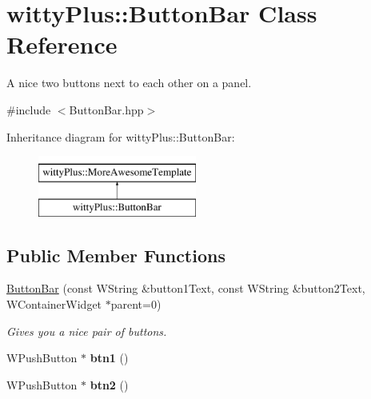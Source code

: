 \hypertarget{classwittyPlus_1_1ButtonBar}{
\section{wittyPlus::ButtonBar Class Reference}
\label{classwittyPlus_1_1ButtonBar}
}


A nice two buttons next to each other on a panel.  




{\ttfamily \#include $<$ButtonBar.hpp$>$}

Inheritance diagram for wittyPlus::ButtonBar:\begin{figure}[H]
\begin{center}
\leavevmode
\includegraphics[height=2.000000cm]{classwittyPlus_1_1ButtonBar}
\end{center}
\end{figure}
\subsection*{Public Member Functions}
\begin{DoxyCompactItemize}
\item 
\hyperlink{classwittyPlus_1_1ButtonBar_afac859783463d6a9703bce3e6358b4dc}{ButtonBar} (const WString \&button1Text, const WString \&button2Text, WContainerWidget $\ast$parent=0)
\begin{DoxyCompactList}\small\item\em Gives you a nice pair of buttons. \item\end{DoxyCompactList}\item 
\hypertarget{classwittyPlus_1_1ButtonBar_a3d21a5593b403b31a124158f351edb36}{
WPushButton $\ast$ {\bfseries btn1} ()}
\label{classwittyPlus_1_1ButtonBar_a3d21a5593b403b31a124158f351edb36}

\item 
\hypertarget{classwittyPlus_1_1ButtonBar_add898daad042ae5676f3a3380dec607f}{
WPushButton $\ast$ {\bfseries btn2} ()}
\label{classwittyPlus_1_1ButtonBar_add898daad042ae5676f3a3380dec607f}

\end{DoxyCompactItemize}
